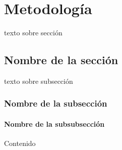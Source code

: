 \documentclass[../proyecto.tex]{memoir}
\begin{document}
\chapter{Metodología}

texto sobre sección

\section{Nombre de la sección}

texto sobre subsección
\subsection{Nombre de la subsección}

\subsubsection{Nombre de la subsubsección}

Contenido
\end{document}
